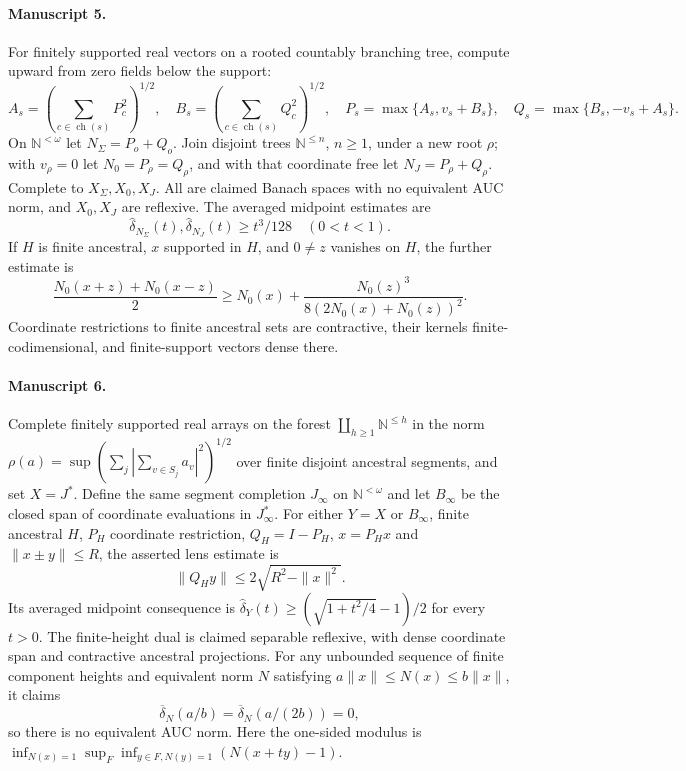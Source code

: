 \documentclass[11pt]{article}
\begin{document}
\paragraph{Manuscript 5.}
For finitely supported real vectors on a rooted countably branching tree, compute upward from zero fields below the support:
\[
 A_s=(\sum_{c\in\operatorname{ch}(s)}P_c^2)^{1/2},\quad
 B_s=(\sum_{c\in\operatorname{ch}(s)}Q_c^2)^{1/2},\quad
 P_s=\max\{A_s,v_s+B_s\},\quad Q_s=\max\{B_s,-v_s+A_s\}.
\]
On $\mathbb N^{<\omega}$ let $N_{\Sigma}=P_o+Q_o$. Join disjoint trees $\mathbb N^{\le n}$, $n\ge1$, under a new root $\rho$; with $v_{\rho}=0$ let $N_0=P_{\rho}=Q_{\rho}$, and with that coordinate free let $N_J=P_{\rho}+Q_{\rho}$. Complete to $X_{\Sigma},X_0,X_J$. All are claimed Banach spaces with no equivalent AUC norm, and $X_0,X_J$ are reflexive. The averaged midpoint estimates are
\[
 \widehat\delta_{N_{\Sigma}}(t),\widehat\delta_{N_J}(t)\ge t^3/128\quad(0<t<1).
\]
If $H$ is finite ancestral, $x$ supported in $H$, and $0\ne z$ vanishes on $H$, the further estimate is
\[
 \frac{N_0(x+z)+N_0(x-z)}2\ge N_0(x)+\frac{N_0(z)^3}{8(2N_0(x)+N_0(z))^2}.
\]
Coordinate restrictions to finite ancestral sets are contractive, their kernels finite-codimensional, and finite-support vectors dense there.

\paragraph{Manuscript 6.}
Complete finitely supported real arrays on the forest $\coprod_{h\ge1}\mathbb N^{\le h}$ in the norm $\rho(a)=\sup(\sum_j|\sum_{v\in S_j}a_v|^2)^{1/2}$ over finite disjoint ancestral segments, and set $X=J^*$. Define the same segment completion $J_{\infty}$ on $\mathbb N^{<\omega}$ and let $B_{\infty}$ be the closed span of coordinate evaluations in $J_{\infty}^*$. For either $Y=X$ or $B_{\infty}$, finite ancestral $H$, $P_H$ coordinate restriction, $Q_H=I-P_H$, $x=P_Hx$ and $\|x\pm y\|\le R$, the asserted lens estimate is
\[
 \|Q_Hy\|\le2\sqrt{R^2-\|x\|^2}.
\]
Its averaged midpoint consequence is $\widehat\delta_Y(t)\ge(\sqrt{1+t^2/4}-1)/2$ for every $t>0$. The finite-height dual is claimed separable reflexive, with dense coordinate span and contractive ancestral projections. For any unbounded sequence of finite component heights and equivalent norm $N$ satisfying $a\|x\|\le N(x)\le b\|x\|$, it claims
\[
 \overline\delta_N(a/b)=\overline\delta_N(a/(2b))=0,
\]
so there is no equivalent AUC norm. Here the one-sided modulus is $\inf_{N(x)=1}\sup_F\inf_{y\in F,N(y)=1}(N(x+ty)-1)$.
\end{document}
